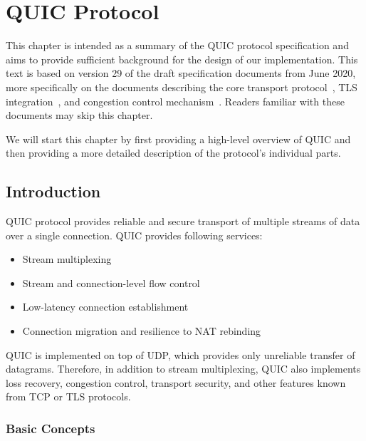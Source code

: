 \chapter{QUIC Protocol}\label{chap:02-quic}

This chapter is intended as a summary of the QUIC protocol specification and aims to provide
sufficient background for the design of our implementation. This text is based on version 29 of the
draft specification documents from June 2020, more specifically on the documents describing the core
transport protocol~\cite{draft-ietf-quic-transport}, TLS integration~\cite{draft-ietf-quic-tls}, and
congestion control mechanism~\cite{draft-ietf-quic-recovery}. Readers familiar with these documents
may skip this chapter.

We will start this chapter by first providing a high-level overview of QUIC and then providing a
more detailed description of the protocol's individual parts.

\section{Introduction}

QUIC protocol provides reliable and secure transport of multiple streams of data over a single
connection. QUIC provides following services:

\begin{itemize}

  \item Stream multiplexing

  \item Stream and connection-level flow control

  \item Low-latency connection establishment

  \item Connection migration and resilience to NAT rebinding

\end{itemize}

QUIC is implemented on top of UDP, which provides only unreliable transfer of datagrams. Therefore,
in addition to stream multiplexing, QUIC also implements loss recovery, congestion control,
transport security, and other features known from TCP or TLS protocols.

\subsection{Basic Concepts}


